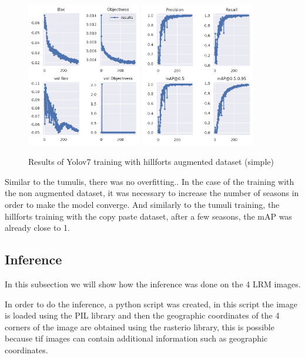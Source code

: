 \begin{figure}[H]
    \centering
    {{\includegraphics[width=5cm]{images/training/castros/maia1.png} }}
    \qquad
    {{\includegraphics[width=5cm]{images/training/castros/maia2.png} }}
    \caption{Results of Yolov7 training with hillforts augmented dataset (simple)}
    \label{fig:hillyolomaia}
\end{figure}

Similar to the tumulis, there was no overfitting.. In the case of the training with the non augmented dataset, it was necessary to increase the number of seasons in order to make the model converge. And similarly to the tumuli training, the hillforts training with the copy paste dataset, after a few seasons, the mAP was already close to 1.



\subsection{Inference}
In this subsection we will show how the inference was done on the 4 LRM images.

In order to do the inference, a python script was created, in this script the image is loaded using the PIL library and then the geographic coordinates of the 4 corners of the image are obtained using the rasterio library, this is possible because tif images can contain additional information such as geographic coordinates. 

